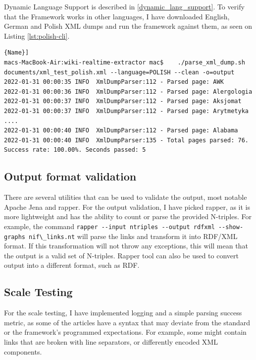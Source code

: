 \documentclass[thesis=M,english,hidelinks]{FITthesis}[2019/12/23]
\begin{document}
Dynamic Language Support is described in \ref{dynamic_lang_support}. To verify that the Framework works in other languages, I have downloaded English, German and Polish XML dumps and run the framework against them, as seen on Listing \ref{lst:polish-cli}. 


\begin{lstlisting}[caption=Example of a Polish processing command,frame=tlrb,  label = {lst:polish-cli}]{Name}]
macs-MacBook-Air:wiki-realtime-extractor mac$    ./parse_xml_dump.sh documents/xml_test_polish.xml --language=POLISH --clean -o=output
2022-01-31 00:00:35 INFO  XmlDumpParser:112 - Parsed page: AWK
2022-01-31 00:00:36 INFO  XmlDumpParser:112 - Parsed page: Alergologia
2022-01-31 00:00:37 INFO  XmlDumpParser:112 - Parsed page: Aksjomat
2022-01-31 00:00:37 INFO  XmlDumpParser:112 - Parsed page: Arytmetyka
....
2022-01-31 00:00:40 INFO  XmlDumpParser:112 - Parsed page: Alabama
2022-01-31 00:00:40 INFO  XmlDumpParser:135 - Total pages parsed: 76. Success rate: 100.00%. Seconds passed: 5
\end{lstlisting}


\subsection{Output format validation}

There are several utilities that can be used to validate the output, most notable Apache Jena and rapper\cite{rapper_utility}. For the output validation, I have picked rapper, as it is more lightweight and has the ability to count or parse the provided N-triples. For example, the command \lstinline{rapper --input ntriples --output rdfxml --show-graphs nif\_links.nt} will parse the links and transform it into RDF/XML format. If this transformation will not throw any exceptions, this will mean that the output is a valid set of N-triples. Rapper tool can also be used to convert output into a different format, such as RDF.

\subsection{Scale Testing}

For the scale testing, I have implemented logging and a simple parsing success metric, as some of the articles have a syntax that may deviate from the standard or the framework's programmed expectations. For example, some might contain links that are broken with line separators, or differently encoded XML components. 
\end{document}
